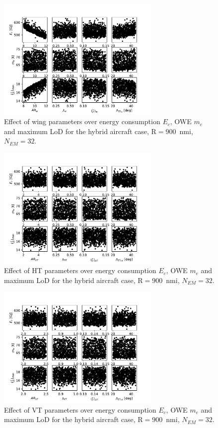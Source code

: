 \begin{figure}[!h]
	\centering
	\includegraphics[keepaspectratio, width=0.7\textwidth]{images/app_sens_plot/hybrid_dep_sens_an_geom_wing}
	\caption{Effect of wing parameters over energy consumption $E_c$, OWE $m_e$ and maximum LoD for the hybrid aircraft case, $\textrm{R}=900$~nmi, $N_{EM}=32$.}
	\label{fig:hybrid_dep_geom_sens_an_wing}
\end{figure}
\begin{figure}[!h]
	\centering
	\includegraphics[keepaspectratio, width=0.7\textwidth]{images/app_sens_plot/hybrid_dep_sens_an_geom_ht}
	\caption{Effect of HT parameters over energy consumption $E_c$, OWE $m_e$ and maximum LoD for the hybrid aircraft case, $\textrm{R}=900$~nmi, $N_{EM}=32$.}
	\label{fig:hybrid_dep_geom_sens_an_ht}
\end{figure}
\begin{figure}[!h]
	\centering
	\includegraphics[keepaspectratio, width=0.7\textwidth]{images/app_sens_plot/hybrid_dep_sens_an_geom_vt}
	\caption{Effect of VT parameters over energy consumption $E_c$, OWE $m_e$ and maximum LoD for the hybrid aircraft case, $\textrm{R}=900$~nmi, $N_{EM}=32$.}
	\label{fig:hybrid_dep_geom_sens_an_vt}
\end{figure}
